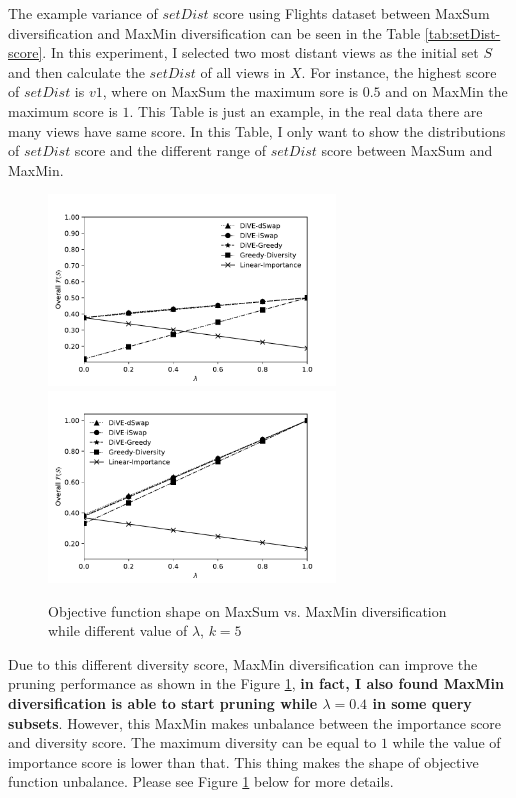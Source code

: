 \documentclass{article}
\begin{document}
The example variance of $ setDist $ score using Flights dataset between MaxSum diversification and MaxMin diversification can be seen in the Table \ref{tab:setDist-score}. In this experiment, I selected two most distant views as the initial set $ S $ and then calculate the $ setDist $ of all views in $ X $. For instance, the highest score of $ setDist $ is $ v1 $, where on MaxSum the maximum sore is $ 0.5 $ and on MaxMin the maximum score is $ 1 $. This Table is just an example, in the real data there are many views have same score. In this Table, I only want to show the distributions of $ setDist $ score and the different range of $ setDist $ score between MaxSum and MaxMin. 

\begin{figure}
	\begin{center}
	\includegraphics[width=3.0in]{figures/1_tradeoff_June_objf_disease_maxSUM}
	\includegraphics[width=3.0in]{figures/1_tradeoff_June_objf_disease_MaxMIN}
	\caption{Objective function shape on MaxSum vs. MaxMin diversification while different value of $\lambda$, $k = 5$}
	\label{fig:Objective-function-maxsum-maxmin}
	\end{center}
\end{figure}

Due to this different diversity score, MaxMin diversification can improve the pruning performance as shown in the Figure \ref{fig:Objective-function-maxsum-maxmin}, \textbf{in fact, I also found MaxMin diversification is able to start pruning while $\lambda = 0.4$ in some query subsets}. However, this MaxMin makes unbalance between the importance score and diversity score. The maximum diversity can be equal to $ 1 $ while the value of importance score is lower than that. This thing makes the shape of objective function unbalance. Please see Figure \ref{fig:Objective-function-maxsum-maxmin} below for more details.
\end{document}
